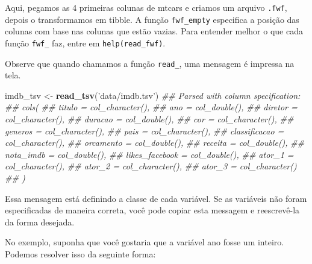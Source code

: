 \documentclass[]{book}
\newenvironment{Shaded}{\begin{snugshade}}{\end{snugshade}}
\newcommand{\CommentTok}[1]{\textcolor[rgb]{0.56,0.35,0.01}{\textit{#1}}}
\newcommand{\KeywordTok}[1]{\textcolor[rgb]{0.13,0.29,0.53}{\textbf{#1}}}
\newcommand{\NormalTok}[1]{#1}
\newcommand{\StringTok}[1]{\textcolor[rgb]{0.31,0.60,0.02}{#1}}
\begin{document}
Aqui, pegamos as 4 primeiras colunas de mtcars e criamos um arquivo \texttt{.fwf}, depois o transformamos em tibble. A função \texttt{fwf\_empty} especifica a posição das colunas com base nas colunas que estão vazias. Para entender melhor o que cada função \texttt{fwf\_} faz, entre em \texttt{help(read\_fwf)}.

Observe que quando chamamos a função \texttt{read\_}, uma mensagem é impressa na tela.

\begin{Shaded}
\begin{Highlighting}[]
\NormalTok{imdb_tsv <-}\StringTok{ }\KeywordTok{read_tsv}\NormalTok{(}\StringTok{'data/imdb.tsv'}\NormalTok{)}
\CommentTok{## Parsed with column specification:}
\CommentTok{## cols(}
\CommentTok{##   titulo = col_character(),}
\CommentTok{##   ano = col_double(),}
\CommentTok{##   diretor = col_character(),}
\CommentTok{##   duracao = col_double(),}
\CommentTok{##   cor = col_character(),}
\CommentTok{##   generos = col_character(),}
\CommentTok{##   pais = col_character(),}
\CommentTok{##   classificacao = col_character(),}
\CommentTok{##   orcamento = col_double(),}
\CommentTok{##   receita = col_double(),}
\CommentTok{##   nota_imdb = col_double(),}
\CommentTok{##   likes_facebook = col_double(),}
\CommentTok{##   ator_1 = col_character(),}
\CommentTok{##   ator_2 = col_character(),}
\CommentTok{##   ator_3 = col_character()}
\CommentTok{## )}
\end{Highlighting}
\end{Shaded}

Essa mensagem está definindo a classe de cada variável. Se as variáveis não foram especificadas de maneira correta, você pode copiar esta messagem e reescrevê-la da forma desejada.

No exemplo, suponha que você gostaria que a variável ano fosse um inteiro. Podemos resolver isso da seguinte forma:
\end{document}
